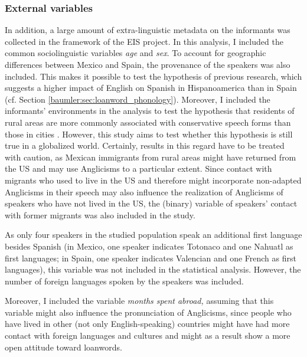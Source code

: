 \documentclass[output=paper]{langscibook}
\begin{document}
%
\setcounter{footnote}{6}


\subsubsection{External variables}\label{baumler:sec:external_variables}
In addition, a large amount of extra-linguistic metadata on the informants was collected in the framework of the \gls*{EIS} project. In this analysis, I included the common sociolinguistic variables \textit{age} and \textit{sex}. To account for geographic differences between Mexico and Spain, the provenance of the speakers was also included. This makes it possible to test the hypothesis of previous research, which suggests a higher impact of English on Spanish in Hispanoamerica than in Spain (cf. Section \ref{baumler:sec:loanword_phonology}). Moreover, I included the informants' environments in the analysis to test the hypothesis that residents of rural areas are more commonly associated with conservative speech forms than those in cities \citetext{\citealp[229]{Sandøy2014}; \citealp[46]{Chambers1998}; \citealp[134]{CaballeroFernandez-Rufete1994}}. 
However, this study aims to test whether this hypothesis is still true in a globalized world. Certainly, results in this regard have to be treated with caution, as Mexican immigrants from rural areas \citep[937]{Fussell2004} might have returned from the US and may use Anglicisms to a particular extent.
Since contact with migrants who used to live in the US and therefore might incorporate non-adapted Anglicisms in their speech may also influence the realization of Anglicisms of speakers who have not lived in the US, the (binary) variable of speakers' contact with former migrants was also included in the study. 

As only four speakers in the studied population speak an additional first language besides Spanish (in Mexico, one speaker indicates Totonaco and one Nahuatl as first languages; in Spain, one speaker indicates Valencian and one French as first languages), this variable was not included in the statistical analysis.
However, the number of foreign languages spoken by the speakers was included. 

Moreover, I included the variable \textit{months spent abroad,} assuming that this variable might also influence the pronunciation of Anglicisms, since people who have lived in other (not only English-speaking) countries might have had more contact with foreign languages and cultures and might as a result show a more open attitude toward loanwords. 
\end{document}
